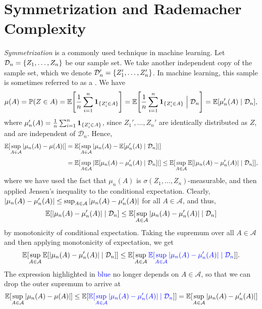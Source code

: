 \section{Symmetrization and Rademacher Complexity}
\label{sec: symmetrization}

\emph{Symmetrization} is a commonly used technique in machine learning. Let $\mathcal{D}_n = \set{Z_1, \dots, Z_n}$ be our sample set. We take another independent copy of the sample set, which we denote $\mathcal{D}_n' = \set{Z_1', \dots, Z_n'}$. In machine learning, this sample is sometimes referred to as a . We have
\[
    \mu(A) = \Prob(Z \in A) = \Exp\left[\frac{1}{n} \sum_{i=1}^n \ind{\{Z_i' \in A\}}\right] = \Exp\left[\frac{1}{n} \sum_{i=1}^n \ind{\{Z_i' \in A\}} \given[\Big] \mathcal{D}_n\right] = \Exp[\mu_n'(A) \given \mathcal{D}_n],
\]
where $\mu_n'(A) = \frac{1}{n} \sum_{i=1}^n \mathbf{1}_{\{Z_i' \in A\}}$, since $Z_1', \dots, Z_n'$ are identically distributed as $Z$, and are independent of $\mathcal{D}_n$. Hence,
\begin{align*}
    \Exp[\sup_{A \in \mathcal{A}} \abs{\mu_n(A) - \mu(A)}] &= \Exp[\sup_{A \in \mathcal{A}} \abs*{\mu_n(A) - \Exp[\mu_n'(A) \given \mathcal{D}_n]}] \\[4pt]
    &= \Exp[\sup_{A \in \mathcal{A}} \abs*{\Exp[\mu_n(A) - \mu_n'(A) \given \mathcal{D}_n]}] \leq \Exp[\sup_{A \in \mathcal{A}} \Exp[\abs*{\mu_n(A) - \mu_n'(A)} \given \mathcal{D}_n]],
\end{align*}
where we have used the fact that $\mu_n(A)$ is $\sigma(Z_1, \dots, Z_n)$-measurable, and then applied Jensen's inequality to the conditional expectation. Clearly, $\abs*{\mu_n(A) - \mu_n'(A)} \leq \sup_{A \in \mathcal{A}} \abs*{\mu_n(A) - \mu_n'(A)}$ for all $A \in \mathcal{A}$, and thus,
\[
    \Exp[\abs*{\mu_n(A) - \mu_n'(A)} \given \mathcal{D}_n] \leq \Exp[\sup_{A \in \mathcal{A}} \abs*{\mu_n(A) - \mu_n'(A)} \given \mathcal{D}_n]
\]
by monotonicity of conditional expectation. Taking the supremum over all $A \in \mathcal{A}$ and then applying monotonicity of expectation, we get
\[
    \Exp[\sup_{A \in \mathcal{A}} \Exp[\abs*{\mu_n(A) - \mu_n'(A)} \given \mathcal{D}_n]] \leq \Exp[\sup_{A \in \mathcal{A}} {\color{blue} \Exp[\sup_{A \in \mathcal{A}} \abs*{\mu_n(A) - \mu_n'(A)} \given \mathcal{D}_n}]].
\]
The expression highlighted in \textcolor{blue}{blue} no longer depends on $A \in \mathcal{A}$, so that we can drop the outer supremum to arrive at
\[
    \Exp[\sup_{A \in \mathcal{A}} \abs{\mu_n(A) - \mu(A)}] \leq \Exp[{\color{blue} \Exp[\sup_{A \in \mathcal{A}} \abs*{\mu_n(A) - \mu_n'(A)} \given \mathcal{D}_n}]] = \Exp[\sup_{A \in \mathcal{A}} \abs*{\mu_n(A) - \mu_n'(A)}]
\]
